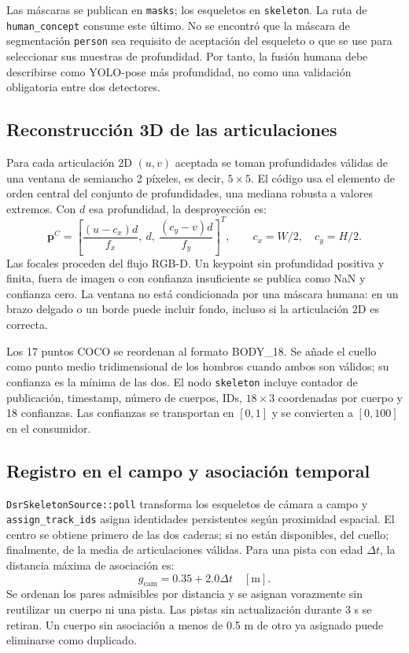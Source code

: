 \documentclass[11pt,a4paper]{article}
\newcommand{\code}[1]{\nolinkurl{#1}}
\begin{document}
Las máscaras se publican en \code{masks}; los esqueletos en \code{skeleton}. La ruta
de \code{human_concept} consume este último. No se encontró que la máscara de
segmentación \code{person} sea requisito de aceptación del esqueleto o que se use
para seleccionar sus muestras de profundidad. Por tanto, la fusión humana debe
describirse como YOLO-pose más profundidad, no como una validación obligatoria entre
dos detectores.~\cite{graphpublisher,skeletonsource}

\subsection{Reconstrucción 3D de las articulaciones}
Para cada articulación 2D $(u,v)$ aceptada se toman profundidades válidas de una
ventana de semiancho 2 píxeles, es decir, $5\times5$. El código usa el elemento de
orden central del conjunto de profundidades, una mediana robusta a valores extremos.
Con $d$ esa profundidad, la desproyección es:
\begin{equation}
 \bm{p}^{C}=\left[
 \frac{(u-c_x)d}{f_x},\ d,\ \frac{(c_y-v)d}{f_y}
 \right]^T,\qquad c_x=W/2,\quad c_y=H/2.
\end{equation}
Las focales proceden del flujo RGB-D. Un keypoint sin profundidad positiva y finita,
fuera de imagen o con confianza insuficiente se publica como NaN y confianza cero.
La ventana no está condicionada por una máscara humana: en un brazo delgado o un
borde puede incluir fondo, incluso si la articulación 2D es correcta.~\cite{graphpublisher}

Los 17 puntos COCO se reordenan al formato BODY\_18. Se añade el cuello como punto
medio tridimensional de los hombros cuando ambos son válidos; su confianza es la
mínima de las dos. El nodo \code{skeleton} incluye contador de publicación, timestamp,
número de cuerpos, IDs, $18\times3$ coordenadas por cuerpo y 18 confianzas. Las
confianzas se transportan en $[0,1]$ y se convierten a $[0,100]$ en el consumidor.
\cite{graphpublisher,skeletonsource}

\subsection{Registro en el campo y asociación temporal}
\code{DsrSkeletonSource::poll} transforma los esqueletos de cámara a campo y
\code{assign_track_ids} asigna identidades persistentes según proximidad espacial.
El centro se obtiene primero de las dos caderas; si no están disponibles, del
cuello; finalmente, de la media de articulaciones válidas. Para una pista con edad
$\Delta t$, la distancia máxima de asociación es:
\begin{equation}
 g_{\mathrm{cam}}=0.35+2.0\Delta t\quad [\mathrm{m}].
\end{equation}
Se ordenan los pares admisibles por distancia y se asignan vorazmente sin reutilizar
un cuerpo ni una pista. Las pistas sin actualización durante 3 s se retiran. Un
cuerpo sin asociación a menos de 0.5 m de otro ya asignado puede eliminarse como
duplicado.~\cite{skeletonsource}
\end{document}
